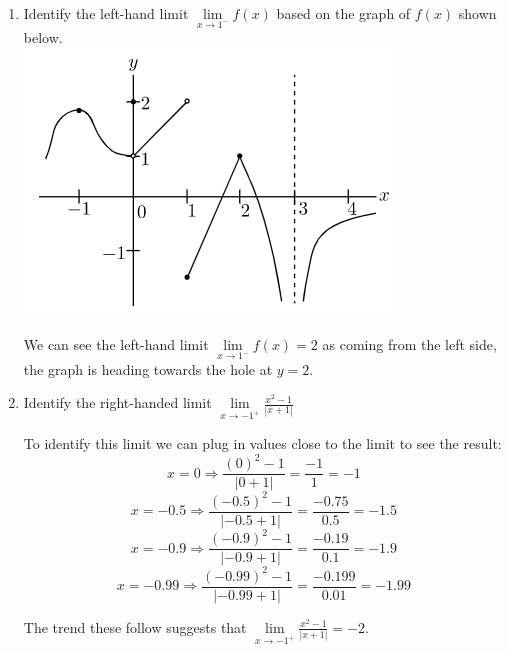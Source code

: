 \documentclass{article}
\begin{document}
\begin{enumerate}
(d) $f(x) = \begin{cases} x^{3} - 1 & x > 2\\ -x^{2} & x \leq 2 \end{cases}$ is not a removable
discontinuity because the two-sided limit is not equal at $x = 2$.

\item Identify the left-hand limit $\underset{x \rightarrow 1^{-}}{\lim} f(x)$ based on the graph
of $f(x)$ shown below.
\\\includegraphics[scale = 1]{Images/Limit1.png}

We can see the left-hand limit $\underset{x \rightarrow 1^{-}}{\lim} f(x) = 2$ as coming from
the left side, the graph is heading towards the hole at $y = 2$.

\item Identify the right-handed limit $\underset{x \rightarrow -1^{+}}{\lim}\frac{x^{2} - 1}{|x + 1|}$

To identify this limit we can plug in values close to the limit to see the result:
\[x = 0 \Longrightarrow \frac{{(0)}^{2} - 1}{|0 + 1|} = \frac{-1}{1} = -1\]
\[x = -0.5 \Longrightarrow \frac{{(-0.5)}^{2} - 1}{|-0.5 + 1|} = \frac{-0.75}{0.5} = -1.5\]
\[x = -0.9 \Longrightarrow \frac{{(-0.9)}^{2} - 1}{|-0.9 + 1|} = \frac{-0.19}{0.1} = -1.9\]
\[x = -0.99 \Longrightarrow \frac{{(-0.99)}^{2} - 1}{|-0.99 + 1|} = \frac{-0.199}{0.01} = -1.99\]

The trend these follow suggests that $\underset{x \rightarrow -1^{+}}{\lim}\frac{x^{2} - 1}{|x + 1|} = -2$.
\end{enumerate}

\pagebreak
\end{document}
